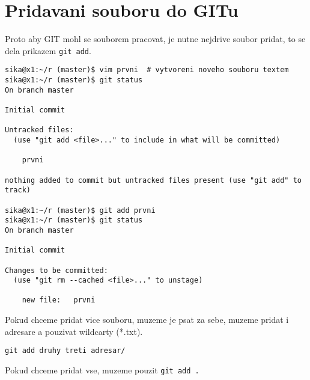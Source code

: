 \section{Pridavani souboru do GITu}

Proto aby GIT mohl se souborem pracovat, je nutne nejdrive soubor pridat, to se dela prikazem \lstinline|git add|.

\begin{lstlisting}
sika@x1:~/r (master)$ vim prvni  # vytvoreni noveho souboru textem
sika@x1:~/r (master)$ git status
On branch master

Initial commit

Untracked files:
  (use "git add <file>..." to include in what will be committed)

    prvni

nothing added to commit but untracked files present (use "git add" to track)

sika@x1:~/r (master)$ git add prvni
sika@x1:~/r (master)$ git status
On branch master

Initial commit

Changes to be committed:
  (use "git rm --cached <file>..." to unstage)

    new file:   prvni
\end{lstlisting}

Pokud chceme pridat vice souboru, muzeme je psat za sebe, muzeme pridat i adresare a pouzivat wildcarty (*.txt).

\begin{lstlisting}
git add druhy treti adresar/
\end{lstlisting}

Pokud chceme pridat vse, muzeme pouzit \lstinline|git add .|

